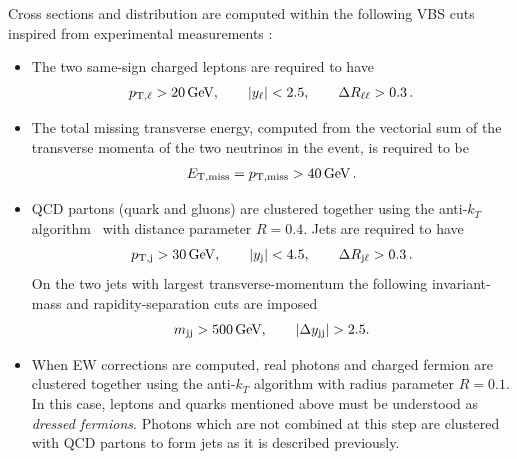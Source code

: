 Cross sections and distribution are computed within the following VBS cuts inspired from experimental measurements \cite{Aad:2014zda,Aaboud:2016ffv,Khachatryan:2014sta,CMS:2017adb}: 
\begin{itemize}
    \item The two same-sign charged leptons are required to have
        \begin{align}
         p_{\text{T},\ell} >  20\,\text{GeV},\qquad |y_{\ell}| < 2.5, \qquad \Delta R_{\ell\ell}> 0.3\,.
        \end{align}
    \item The total missing transverse energy, computed from the vectorial sum of the transverse momenta of the two neutrinos in the event,
        is required to be
        \begin{align}
          E_{\text{T},\text{miss}}=p_{\rm T, miss} >  40\,\text{GeV}\,.
        \end{align}
    \item QCD partons (quark and gluons) are clustered together using the anti-$k_T$ algorithm~\cite{} with distance parameter $R=0.4$. Jets are required
        to have
        \begin{align}
         p_{\text{T},\text{j}} >  30\,\text{GeV}, \qquad |y_\text{j}| < 4.5, \qquad \Delta R_{\text{j}\ell} > 0.3 \,.
        \end{align}
        On the two jets with largest transverse-momentum the following invariant-mass and rapidity-separation cuts are imposed
        \begin{align}
         m_{\text{j} \text{j}} >  500\,\text{GeV},\qquad |\Delta y_{\text{j} \text{j}}| > 2.5.
        \end{align}
    \item When EW corrections are computed, real photons and charged fermion are clustered together using the anti-$k_T$ algorithm with 
        radius parameter $R=0.1$. In this case, leptons and quarks mentioned above must be understood as {\it dressed fermions}. Photons
        which are not combined at this step are clustered with QCD partons to form jets as it is described previously.
\end{itemize}

